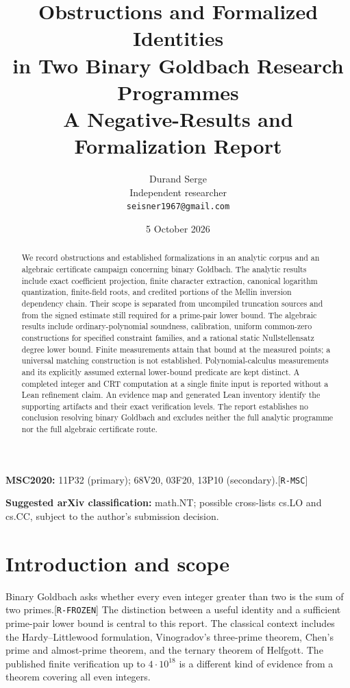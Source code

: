 \documentclass[11pt]{article}
\title{Obstructions and Formalized Identities\\in Two Binary Goldbach Research Programmes\\[4pt]\large A Negative-Results and Formalization Report}
\author{Durand Serge\\\small Independent researcher\\\small\texttt{seisner1967@gmail.com}}
\date{5 October 2026}
\newcommand{\ev}[1]{{\scriptsize[\nolinkurl{#1}]}}
\theoremstyle{remark}
\begin{document}
\maketitle
\begin{abstract}
We record obstructions and established formalizations in an analytic corpus and
an algebraic certificate campaign concerning binary Goldbach. The analytic
results include exact coefficient projection, finite character extraction,
canonical logarithm quantization, finite-field roots, and credited portions of
the Mellin inversion dependency chain. Their scope is separated from
uncompiled truncation sources and from the signed estimate still required for
a prime-pair lower bound. The algebraic results include ordinary-polynomial
soundness, calibration, uniform common-zero constructions for specified
constraint families, and a rational static Nullstellensatz degree lower bound.
Finite measurements attain that bound at the measured points; a universal
matching construction is not established. Polynomial-calculus measurements
and its explicitly assumed external lower-bound predicate are kept distinct.
A completed integer and CRT computation at a single finite input is reported
without a Lean refinement claim. An evidence map and generated Lean inventory
identify the supporting artifacts and their exact verification levels. The
report establishes no conclusion resolving binary Goldbach and excludes
neither the full analytic programme nor the full algebraic certificate route.
\end{abstract}
\noindent\textbf{MSC2020:} 11P32 (primary); 68V20, 03F20, 13P10 (secondary).\ev{R-MSC}
\par\noindent\textbf{Suggested arXiv classification:} math.NT; possible cross-lists
cs.LO and cs.CC, subject to the author's submission decision.

\section{Introduction and scope}
Binary Goldbach asks whether every even integer greater than two is the sum
of two primes.\ev{R-FROZEN} The distinction between a useful identity and a sufficient
prime-pair lower bound is central to this report. The classical context
includes the Hardy--Littlewood formulation, Vinogradov's three-prime theorem,
Chen's prime and almost-prime theorem, and the ternary theorem of
Helfgott.\cite{hl1923,vinogradov1937,chen1973,helfgott2013}
The published finite verification up to $4\cdot10^{18}$ is a different kind
of evidence from a theorem covering all even integers.\cite{osilva2014}
\end{document}
